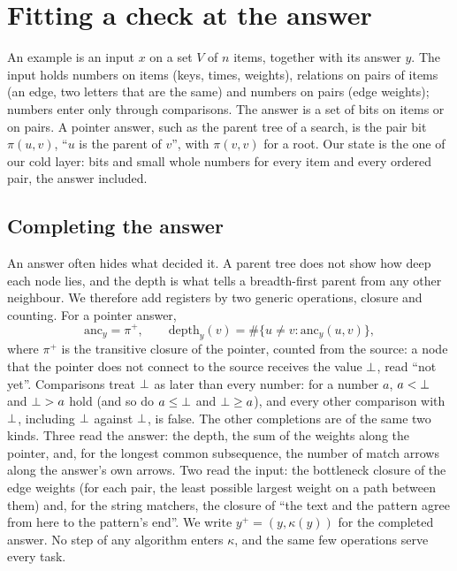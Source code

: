 \section{Fitting a check at the answer}\label{sec:setting}

An example is an input $x$ on a set $V$ of $n$ items, together with its answer $y$. The input holds numbers on items
(keys, times, weights), relations on pairs of items (an edge, two letters that are the same) and numbers on pairs (edge
weights); numbers enter only through comparisons. The answer is a set of bits on items or on pairs. A pointer answer,
such as the parent tree of a search, is the pair bit $\pi(u,v)$, ``$u$ is the parent of $v$'', with $\pi(v,v)$ for a
root. Our state is the one of our cold layer\cite{mohsenvand2026zero}: bits and small whole numbers for every item and
every ordered pair, the answer included.

\subsection{Completing the answer}

An answer often hides what decided it. A parent tree does not show how deep each node lies, and the depth is what tells
a breadth-first parent from any other neighbour. We therefore add registers by two generic operations, closure and
counting. For a pointer answer,
\begin{equation}
\mathrm{anc}_y = \pi^{+}, \qquad \mathrm{depth}_y(v) = \#\{u \neq v : \mathrm{anc}_y(u,v)\},
\label{eq:completion}
\end{equation}
where $\pi^{+}$ is the transitive closure of the pointer, counted from the source: a node that the pointer does not
connect to the source receives the value $\bot$, read ``not yet''. Comparisons treat $\bot$ as later than every
number: for a number $a$, $a < \bot$ and $\bot > a$ hold (and so do $a \leq \bot$ and $\bot \geq a$), and
every other comparison with $\bot$, including $\bot$ against $\bot$, is false. The other completions are of the
same two kinds. Three read the answer: the depth, the sum of the weights along the pointer, and, for the longest common
subsequence, the number of match arrows along the answer's own arrows. Two read the input: the bottleneck closure of the
edge weights (for each pair, the least possible largest weight on a path between them) and, for the string matchers, the
closure of ``the text and the pattern agree from here to the pattern's end''. We write $y^{+} = (y, \kappa(y))$ for the
completed answer. No step of any algorithm enters $\kappa$, and the same few operations serve every task.

